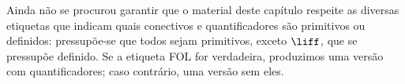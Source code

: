 \documentclass[../../../include/open-logic-chapter]{subfiles}
\begin{document}
      {}
      {}

\begin{editorial}
  Ainda não se procurou garantir que o material deste capítulo respeite
  as diversas etiquetas que indicam quais conectivos e quantificadores
  são primitivos ou definidos: pressupõe-se que todos sejam primitivos,
  exceto $\liff$, que se pressupõe definido. Se a etiqueta FOL for
  verdadeira, produzimos uma versão com quantificadores; caso contrário,
  uma versão sem eles.
\end{editorial}














\OLEndChapterHook
\end{document}
